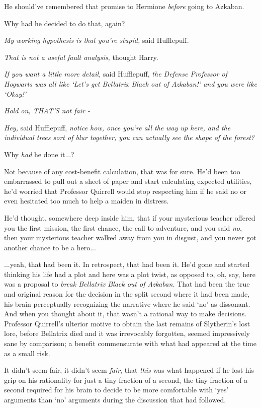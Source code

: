He should've remembered that promise to Hermione \emph{before} going to
Azkaban.

Why had he decided to do that, again?

\emph{My working hypothesis is that you're stupid,} said Hufflepuff.

\emph{That is not a useful fault analysis,} thought Harry.

\emph{If you want a little more detail,} said Hufflepuff, \emph{the
Defense Professor of Hogwarts was all like `Let's get Bellatrix Black
out of Azkaban!' and you were like `Okay!'}

\emph{Hold on, THAT'S not fair -}

\emph{Hey,} said Hufflepuff, \emph{notice how, once you're all the way
up here, and the individual trees sort of blur together, you can
actually see the shape of the forest?}

Why \emph{had} he done it...?

Not because of any cost-benefit calculation, that was for sure. He'd
been too embarrassed to pull out a sheet of paper and start calculating
expected utilities, he'd worried that Professor Quirrell would stop
respecting him if he said no or even hesitated too much to help a maiden
in distress.

He'd thought, somewhere deep inside him, that if your mysterious teacher
offered you the first mission, the first chance, the call to adventure,
and you said \emph{no}, then your mysterious teacher walked away from
you in disgust, and you never got another chance to be a hero...

...yeah, that had been it. In retrospect, that had been it. He'd
gone and started thinking his life had a plot and here was a plot twist,
as opposed to, oh, say, here was a proposal to \emph{break Bellatrix
Black out of Azkaban.} That had been the true and original reason for
the decision in the split second where it had been made, his brain
perceptually recognizing the narrative where he said `no' as dissonant.
And when you thought about it, that wasn't a rational way to make
decisions. Professor Quirrell's ulterior motive to obtain the last
remains of Slytherin's lost lore, before Bellatrix died and it was
irrevocably forgotten, seemed impressively sane by comparison; a benefit
commensurate with what had appeared at the time as a small risk.

It didn't seem fair, it didn't seem \emph{fair}, that \emph{this} was
what happened if he lost his grip on his rationality for just a tiny
fraction of a second, the tiny fraction of a second required for his
brain to decide to be more comfortable with `yes' arguments than `no'
arguments during the discussion that had followed.

